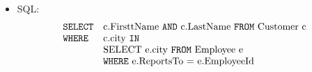 \begin{exercise}{16}
  \begin{subexercise}
    \begin{itemize}
      \item SQL: 
            \begin{displaymath}
              \begin{array}{l l}
                \text{\texttt{SELECT}}& \text{c.FirsttName \texttt{AND} c.LastName
                      \texttt{FROM} Customer c}\\
                \text{\texttt{WHERE}}& \text{c.city \texttt{IN} }\\
                                     & \text{SELECT e.city \texttt{FROM} Employee e }\\
                                     & \text{\texttt{WHERE} e.ReportsTo = e.EmployeeId}
              \end{array}
            \end{displaymath}


\end{itemize}
\end{subexercise}
\end{exercise}
